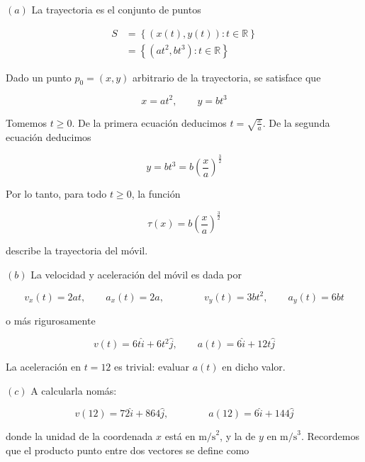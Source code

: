 \documentclass[12pt]{article}
\theoremstyle{definition}
\begin{document}
$(a)$ La trayectoria es el conjunto de puntos 

\begin{align*}
    S 
    &= \left\{ \left( x(t),  y(t) \right) : t \in \mathbb{R}  \right\} \\ 
    &= \left\{ (at^2, bt^3) : t \in \mathbb{R}\right\} 
\end{align*}

Dado un punto $p_0 = (x, y)$ arbitrario de la trayectoria, se satisface que 

\begin{equation*}
    x = at^2, \qquad y = bt^3
\end{equation*}

Tomemos $t \geq 0$. De la primera ecuación deducimos $t =
\sqrt{\frac{x}{a}} $. De la segunda ecuación deducimos 

\begin{equation*}
    y = bt^3 = b \left( \frac{x}{a}
    \right)^{\frac{3}{2}}
\end{equation*}

Por lo tanto, para todo $t \geq 0$, la función 

\begin{equation*}
    \tau(x) = b\left( \frac{x}{a} \right)^{\frac{3}{2}}
\end{equation*}

describe la trayectoria del móvil.

$(b)$ La velocidad y aceleración del móvil es dada por

\begin{equation*}
    v_x(t) = 2at, \qquad a_x(t) = 2a, \qquad \qquad v_y(t) = 3bt^2, \qquad
    a_y(t) = 6bt
\end{equation*}

o más rigurosamente 

\begin{equation*}
    v(t) = 6t \hat{i} + 6t^2 \hat{j}, \qquad a(t) = 6 \hat{i} + 12t \hat{j}
\end{equation*}

La aceleración en $t = 12$ es trivial: evaluar $a(t)$ en dicho valor.


$(c)$ A calcularla nomás: 

\begin{equation*}
    v(12) = 72 \hat{i} + 864 \hat{j}, \qquad \qquad
    a(12) =  6 \hat{i} + 144 \hat{j}
\end{equation*}

donde la unidad de la coordenada $x$ está en $\text{m/s}^2$, y la de $y$ en
$\text{m/s}^3$. Recordemos que el producto punto entre dos vectores se define 
como
\end{document}
